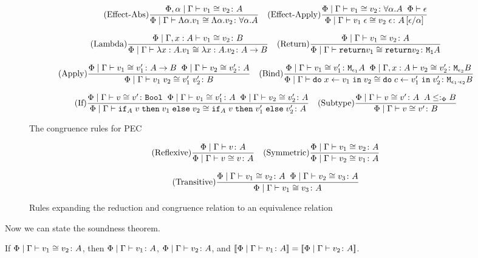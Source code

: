 \documentclass{Report}
\begin{document}
\begin{figure}[h!]
    \[
        (\text{Effect-Abs}) \frac{\Phi, \alpha\mid\Gamma \vdash v_1 \cong v_2 \colon A}{\Phi\mid\Gamma \vdash \Lambda \alpha. v_1 \cong \Lambda \alpha. v_2 \colon \forall \alpha. A}
        \quad
        (\text{Effect-Apply}) \frac{\Phi\mid\Gamma \vdash v_1 \cong v_2 \colon \forall \alpha. A\;\;\Phi\vdash \epsilon}{\Phi\mid\Gamma \vdash v_1\;\epsilon \cong v_2\;\epsilon \colon A\left[\epsilon / \alpha\right]}
    \]

    \[
        (\text{Lambda}) \frac{\Phi\mid\Gamma, x: A \vdash v_1 \cong v_2 \colon B}{\Phi\mid\Gamma \vdash \lambda x : A. v_1 \cong \lambda x : A. v_2 \colon A\rightarrow B}
        \quad
        (\text{Return}) \frac{\Phi\mid\Gamma \vdash v_1 \cong v_2 \colon A}{\Phi\mid\Gamma \vdash \texttt{return} v_1 \cong \texttt{return} v_2 \colon \texttt{M}_{\texttt{1}}{A}}
    \]

    \[
        (\text{Apply}) \frac{\Phi\mid\Gamma \vdash v_1 \cong v_1' \colon A\rightarrow B\;\;\Phi\mid\Gamma \vdash v_2 \cong v_2' \colon A}{\Phi\mid\Gamma \vdash v_1\; v_2 \cong v_1'\; v_2' \colon B}
        \quad   
        (\text{Bind}) \frac{\Phi\mid\Gamma \vdash v_1 \cong v_1' \colon \texttt{M}_{\epsilon_1}{A} \;\; \Phi\mid\Gamma, x: A \vdash v_2 \cong v_2' \colon \texttt{M}_{\epsilon_2}{B}}{\Phi\mid\Gamma \vdash \texttt{do}\; x \leftarrow v_1 \;\texttt{in}\; v_2 \cong \texttt{do}\; c \leftarrow v_1' \;\texttt{in}\; v_2' \colon \texttt{M}_{\epsilon_1 \cdot \epsilon_2}{B}} 
    \]

    \[
        (\text{If}) \frac{\Phi\mid\Gamma \vdash v \cong v' \colon \texttt{Bool} \;\; \Phi\mid\Gamma \vdash v_1 \cong v_1' \colon A\;\;\Phi\mid\Gamma \vdash v_2 \cong v_2' \colon A}{\Phi\mid\Gamma \vdash \texttt{if}_{A}\; v\; \texttt{then}\; v_1 \;\texttt{else} \; v_2 \cong \texttt{if}_{A}\; v\; \texttt{then}\; v_1' \;\texttt{else} \; v_2' \colon A}
        \quad    
        (\text{Subtype}) \frac{\Phi\mid\Gamma \vdash v \cong v' \colon A \;\; A \leq:_\Phi B}{\Phi\mid\Gamma \vdash v \cong v' \colon B}
    \]
    \caption{The congruence rules for PEC}
    \label{BetaEtaCongruence}
\end{figure}

\begin{figure}
    \[
        (\text{Reflexive}) \frac{\Phi\mid\Gamma \vdash v \colon A}{\Phi\mid\Gamma \vdash v \cong v \colon A}
        \quad
        (\text{Symmetric}) \frac{\Phi\mid\Gamma \vdash v_1 \cong v_2 \colon A}{\Phi\mid\Gamma \vdash v_2 \cong v_1 \colon A}
    \]

    \[
        (\text{Transitive}) \frac{\Phi\mid\Gamma \vdash v_1 \cong v_2 \colon A\;\;\Phi\mid\Gamma \vdash v_2 \cong v_3 \colon A}{\Phi\mid\Gamma \vdash v_1 \cong v_3 \colon A}
    \]
    \caption{Rules expanding the reduction and congruence relation to an equivalence relation}
    \label{BetaEtaEquivalence}
\end{figure}


Now we can state the soundness theorem. 

\begin{theorem}[Soundness]
    If $\Phi\mid\Gamma \vdash v_1 \cong v_2 \colon A$, then $\Phi\mid\Gamma \vdash v_1 \colon A$, $\Phi\mid\Gamma \vdash v_2 \colon A$, and ${\bf [\![}\Phi\mid\Gamma \vdash v_1 \colon A{\bf ]\!]} = {\bf [\![}\Phi\mid\Gamma \vdash v_2 \colon A{\bf ]\!]}$.
\end{theorem}
\end{document}
